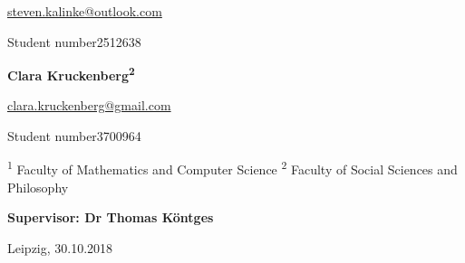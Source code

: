 \begin{titlepage}
\begin{center}
\begin{minipage}[t]{.6\textwidth}
		\begin{normalsize}
			\href{mailto:steven.kalinke@outlook.com}{steven.kalinke@outlook.com}
			
			\libertineLF
			{\footnotesize Student number\enspace{}2512638} \vspace*{1cm}
		\end{normalsize}
	\end{minipage}%
	\begin{minipage}[t]{.4\textwidth}
		\large{\textbf{Clara Kruckenberg\textsuperscript{2}}} \vspace*{0.3cm}
		
		\begin{normalsize}
			\href{clara.kruckenberg@gmail.com}{clara.kruckenberg@gmail.com} %
			
			\libertineLF
			{\footnotesize Student number\enspace{}3700964} \vspace*{0.1cm}
		\end{normalsize}
	\end{minipage}


	\end{center}


	\noindent
	{\footnotesize \textsuperscript{1} Faculty of Mathematics and Computer Science \quad{}\textsuperscript{2} Faculty of Social Sciences and Philosophy} \vspace*{1cm}
	
	\noindent
	\textbf{{\large Supervisor: Dr Thomas Köntges}} \vspace*{0.5cm}
	
	\noindent
	{\small Leipzig, 30.10.2018}
	
	
\end{titlepage}